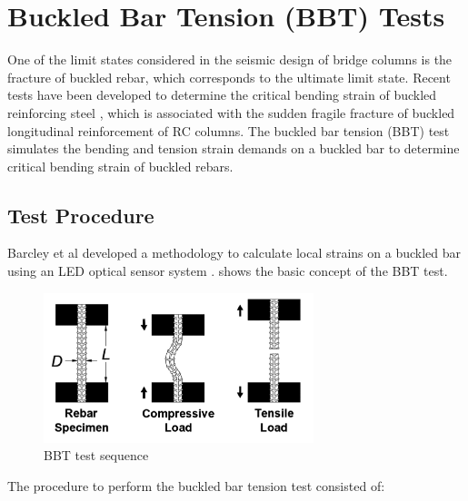 \section{Buckled Bar Tension (BBT) Tests}

One of the limit states considered in the seismic design of bridge columns is the fracture of buckled rebar, which corresponds to the ultimate limit state. Recent tests have been developed to determine the critical bending strain of buckled reinforcing steel \cite{Barcley2019}, which is associated with the sudden fragile fracture of buckled longitudinal reinforcement of RC columns. The buckled bar tension (BBT) test simulates the bending and tension strain demands on a buckled bar to determine critical bending strain of buckled rebars. 

\subsection{Test Procedure}
Barcley et al \cite{Barcley2019} developed a methodology to calculate local strains on a buckled bar using an LED optical sensor system \cite{NorthernDigitalInc.2020}.  shows the basic concept of the BBT test.

\begin{figure}[htbp]
	\centering
	\includegraphics[width=0.7\textwidth]{Chapter-3/figs/BBT_Sequence}
	\caption{BBT test sequence\cite{Barcley2019}}
	\label{fig:BBTseq}
\end{figure}

The procedure to perform the buckled bar tension test consisted of:

